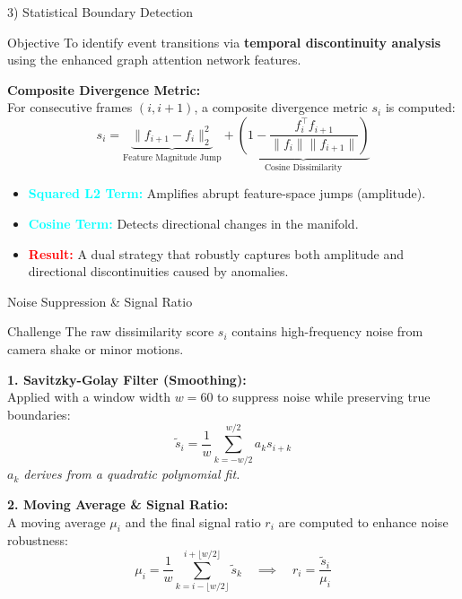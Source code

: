 \documentclass[aspectratio=169,xcolor=dvipsnames]{beamer}
\begin{document}
	
	\begin{frame}{3) Statistical Boundary Detection}
		\small
		
		\begin{block}{Objective}
			To identify event transitions via \textbf{temporal discontinuity analysis} using the enhanced graph attention network features.
		\end{block}
		
		\vspace{0.5em}
		\textbf{Composite Divergence Metric:} \\
		For consecutive frames $(i, i+1)$, a composite divergence metric $s_i$ is computed:
		\[
		s_i = \underbrace{\lVert f_{i+1} - f_i \rVert_2^2}_{\text{Feature Magnitude Jump}} + \underbrace{\left( 1 - \frac{f_i^\top f_{i+1}}{\lVert f_i \rVert \lVert f_{i+1} \rVert} \right)}_{\text{Cosine Dissimilarity}}
		\]
		
		\vspace{0.5em}
		\begin{itemize}
			\item \textcolor{cyan}{\textbf{Squared L2 Term:}} Amplifies abrupt feature-space jumps (amplitude).
			\item \textcolor{cyan}{\textbf{Cosine Term:}} Detects directional changes in the manifold.
			\item \textbf{\textcolor{red}{Result:}} A dual strategy that robustly captures both amplitude and directional discontinuities caused by anomalies.
		\end{itemize}
	\end{frame}
	
	
	
	\begin{frame}{Noise Suppression \& Signal Ratio}
		\small
		
		\begin{alertblock}{Challenge}
			The raw dissimilarity score $s_i$ contains high-frequency noise from camera shake or minor motions.
		\end{alertblock}
		
		\textbf{1. Savitzky-Golay Filter (Smoothing):} \\
		Applied with a window width $w = 60$ to suppress noise while preserving true boundaries:
		\[
		\tilde{s}_i = \frac{1}{w} \sum_{k=-w/2}^{w/2} a_k s_{i+k}
		\]
		\textit{\scriptsize * $a_k$ derives from a quadratic polynomial fit.}
		
		\vspace{0.5em}
		\textbf{2. Moving Average \& Signal Ratio:} \\
		A moving average $\mu_i$ and the final signal ratio $r_i$ are computed to enhance noise robustness:
		\[
		\mu_i = \frac{1}{w} \sum_{k=i-\lfloor w/2 \rfloor}^{i+\lfloor w/2 \rfloor} \tilde{s}_k \quad \implies \quad r_i = \frac{\tilde{s}_i}{\mu_i}
		\]
	\end{frame}
	
\end{document}

